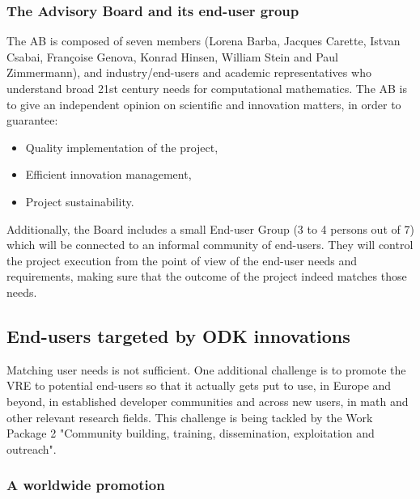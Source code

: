 \documentclass{deliverablereport}
\begin{document}
\subsubsection{The Advisory Board and its end-user group}

The AB is composed of seven members (Lorena Barba, Jacques Carette,
Istvan Csabai, Françoise Genova, Konrad Hinsen, William Stein and Paul
Zimmermann), and industry/end-users and academic representatives who
understand broad 21st century needs for computational mathematics.
The AB is to give an independent opinion on scientific and innovation
matters, in order to guarantee:

\begin{itemize}
\item Quality implementation of the project,
\item Efficient innovation management,
\item Project sustainability.
\end{itemize}

Additionally, the Board includes a small End-user Group (3 to 4 persons out
of 7) which will be connected to an informal community of
end-users. They will control the project execution from the point of
view of the end-user needs and requirements, making sure that the
outcome of the project indeed matches those needs.

\subsection{End-users targeted by ODK innovations}

Matching user needs is not sufficient. One additional challenge is to
promote the VRE to potential end-users so that it actually gets put to
use, in Europe and beyond, in established developer communities and
across new users, in math and other relevant research fields. This
challenge is being tackled by the Work Package 2 "Community building,
training, dissemination, exploitation and outreach".


\subsubsection{A worldwide promotion}
\end{document}
